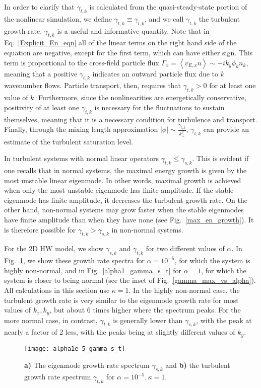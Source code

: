 \documentclass[twocolumn,showkeys,superscriptaddress]{revtex4}
\begin{document}
In order to clarify that $\gamma_{l,k}$ is calculated from the quasi-steady-state portion of the nonlinear simulation, we define $\gamma_{t,k} \equiv \gamma_{l,k}$, and we call $\gamma_{t,k}$ the turbulent growth rate.
$\gamma_{t,k}$ is a useful and informative quantity. 
Note that in Eq.~\ref{Explicit_En_eqn} all of the linear terms on the right hand side of the equation are negative, except for the first term, which can have either sign. 
This term is proportional to the cross-field particle flux $\Gamma_x = \left< v_{E,x} n \right> \sim -i k_y \phi_k n_k$, meaning that a positive $\gamma_{t,k}$ indicates an outward particle flux
due to $k$ wavenumber flows. Particle transport, then, requires that $\gamma_{t,k} > 0$ for at least one value of $k$. Furthermore, since the nonlinearities are energetically conservative,
positivity of at least one $\gamma_{t,k}$ is necessary for the fluctuations to sustain themselves, meaning that it is a necessary condition for turbulence and transport. 
Finally, through the mixing length approximation $|\phi| \sim \frac{\gamma_{t,k}}{k_\perp^2}$, $\gamma_{t,k}$ can provide an estimate of the turbulent saturation level.

In turbulent systems with normal linear operators $\gamma_{t,k} \le \gamma_{s,k}$. This is evident if one recalls that in normal systems, the maximal
energy growth is given by the most unstable linear eigenmode. In other words, maximal growth is achieved when only the most unstable eigenmode has finite amplitude.
If the stable eigenmode has finite amplitude, it decreases the turbulent growth rate.
On the other hand, non-normal systems may grow faster when the stable eigenmodes have finite amplitude than when they have none (see Fig.~\ref{max_en_growth}). 
It is therefore possible for $\gamma_{t,k} > \gamma_{s,k}$ in non-normal systems.

For the 2D HW model, we show
$\gamma_{s,k}$ and $\gamma_{t,k}$ for two different values of $\alpha$. In Fig.~\ref{alpha1e-5_gamma_s_t}, we show these growth rate spectra for $\alpha = 10^{-5}$, for which the system is
highly non-normal, and in Fig.~\ref{alpha1_gamma_s_t} for $\alpha = 1$, for which the system is closer to being normal (see the inset of Fig.~\ref{gamma_max_vs_alpha}). All calculations in this section use $\kappa=1$. 
In the highly non-normal case, the turbulent growth rate is very similar to the eigenmode growth rate for most values of $k_x,k_y$, but about 6 times higher where the spectrum peaks. For the more normal
case, in contrast, $\gamma_{t,k}$ is generally lower than $\gamma_{s,k}$, with the peak at nearly a factor of 2 less, with the peaks being at slightly different values of $k_y$.
\begin{figure}
\centerline{\texttt{[image: alpha1e-5\_gamma\_s\_t]}}
\caption{{\bf a)} The eigenmode growth rate spectrum $\gamma_{s,k}$ and {\bf b)} the turbulent growth rate spectrum $\gamma_{t,k}$ for $\alpha = 10^{-5}, \kappa=1$.}
\label{alpha1e-5_gamma_s_t}
\end{figure}
\end{document}

